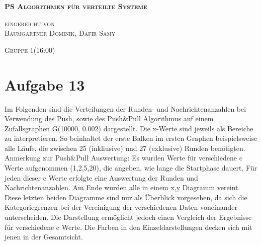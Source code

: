 \documentclass[12pt,a4paper]{report}
\begin{document}
\begin{titlepage}
	\begin{center}

		\vspace*{1.0cm}
		\huge
		\textsc{\bf{PS Algorithmen für verteilte Systeme}}

		\vspace*{4.0cm}
		\textsc{
			\normalsize{eingereicht von} \\[0.5\baselineskip]
			{\large Baumgartner Dominik, Dafir Samy}
		}

		\vspace*{3.0cm}
		\textsc{
			\normalsize{Gruppe  1(16:00)}
		}

	\end{center}
\end{titlepage}

\section*{Aufgabe 13}
Im Folgenden sind die Verteilungen der Runden- und Nachrichtenanzahlen bei Verwendung des Push, sowie des Push\&Pull Algorithmus auf einem Zufallsgraphen G(10000, 0.002) dargestellt.
Die x-Werte sind jeweils als Bereiche zu interpretieren. So beinhaltet der erste Balken im ersten Graphen beispielsweise alle Läufe, die zwischen 25 (inkliusive) und 27 (exklusive) Runden benötigten.\\
Anmerkung zur Push\&Pull Auswertung: Es wurden Werte für verschiedene c Werte aufgenommen (1,2,5,20), die angeben, wie lange die Startphase dauert. Für jeden dieser c Werte erfolgte eine Auswertung der Runden und Nachrichtenanzahlen. Am Ende wurden alle in einem x,y Diagramm vereint. Diese letzten beiden Diagramme sind nur als Überblick vorgesehen, da sich die Kategoriegrenzen bei der Vereinigung der verschiedenen Daten voneinander unterscheiden. Die Darstellung ermöglicht jedoch einen Vergleich der Ergebnisse für verschiedene c Werte. Die Farben in den Einzeldarstellungen decken sich mit jenen in der Gesamtsicht.












\end{document}
